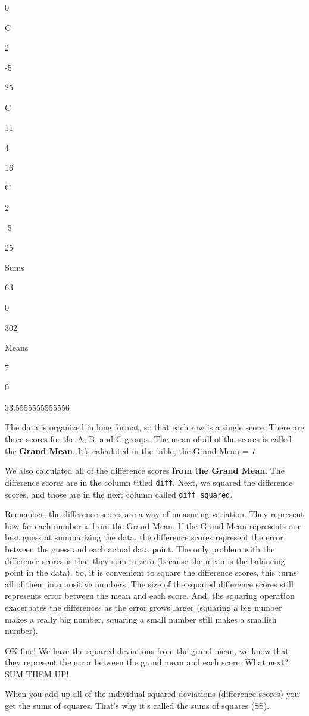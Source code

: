 \documentclass[]{book}
\begin{document}
0

C

2

-5

25

C

11

4

16

C

2

-5

25

Sums

63

0

302

Means

7

0

33.5555555555556

The data is organized in long format, so that each row is a single score. There are three scores for the A, B, and C groups. The mean of all of the scores is called the \textbf{Grand Mean}. It's calculated in the table, the Grand Mean = 7.

We also calculated all of the difference scores \textbf{from the Grand Mean}. The difference scores are in the column titled \texttt{diff}. Next, we squared the difference scores, and those are in the next column called \texttt{diff\_squared}.

Remember, the difference scores are a way of measuring variation. They represent how far each number is from the Grand Mean. If the Grand Mean represents our best guess at summarizing the data, the difference scores represent the error between the guess and each actual data point. The only problem with the difference scores is that they sum to zero (because the mean is the balancing point in the data). So, it is convenient to square the difference scores, this turns all of them into positive numbers. The size of the squared difference scores still represents error between the mean and each score. And, the squaring operation exacerbates the differences as the error grows larger (squaring a big number makes a really big number, squaring a small number still makes a smallish number).

OK fine! We have the squared deviations from the grand mean, we know that they represent the error between the grand mean and each score. What next? SUM THEM UP!

When you add up all of the individual squared deviations (difference scores) you get the sums of squares. That's why it's called the sums of squares (SS).
\end{document}
